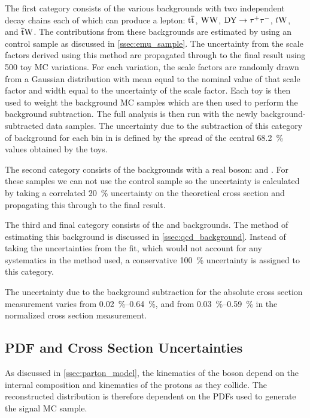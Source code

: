 The first category consists of the various backgrounds with two independent
decay chains each of which can produce a lepton: $\text{t} \overline{\text{t}}$, $\text{W}\text{W}$,
$\text{DY} \to \tau^{+} \tau^{-}$, $t\text{W}$, and $\overline{\text{t}}\text{W}$. The contributions from these backgrounds
are estimated by using an \emu control sample as discussed in
\cref{ssec:emu_sample}. The uncertainty from the scale factors derived using
this method are propagated through to the final result using 500 toy MC
variations. For each variation, the scale factors are randomly drawn from a
Gaussian distribution with mean equal to the nominal value of that scale factor
and width equal to the uncertainty of the scale factor. Each toy is then used
to weight the background MC samples which are then used to perform the
background subtraction. The full analysis is then run with the newly
background-subtracted data samples. The uncertainty due to the subtraction of
this category of background for each bin in \phistar is defined by the spread
of the central \SI{68.2}{\percent} values obtained by the toys.

The second category consists of the backgrounds with a real \Z boson: \ZZ and
\WZ. For these samples we can not use the \emu control sample so the
uncertainty is calculated by taking a correlated \SI{20}{\percent} uncertainty
on the theoretical cross section and propagating this through to the final
result.

The third and final category consists of the \QCDjets and \wjets backgrounds.
The method of estimating this background is discussed in
\cref{ssec:qcd_background}. Instead of taking the uncertainties from the fit,
which would not account for any systematics in the method used, a conservative
\SI{100}{\percent} uncertainty is assigned to this category.

The uncertainty due to the background subtraction for the absolute cross
section measurement varies from \SIrange{0.02}{0.64}{\percent}, and from
\SIrange{0.03}{0.59}{\percent} in the normalized cross section measurement.

\subsection{PDF and Cross Section Uncertainties}
\label{ssec:pdf_uncertainties}

As discussed in \cref{ssec:parton_model}, the kinematics of the \Z boson
depend on the internal composition and kinematics of the protons as they
collide. The reconstructed \phistar distribution is therefore dependent on the
PDFs used to generate the signal MC sample.

